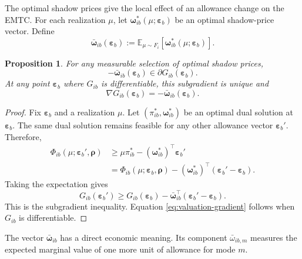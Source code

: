 \documentclass{article}
\newtheorem{proposition}{Proposition}
\begin{document}
The optimal shadow prices give the local effect of an allowance change
on the EMTC. For each realization $\mu$, let
$\bm\omega_{ib}^*(\mu;\bm\varepsilon_b)$ be an optimal shadow-price
vector. Define
\begin{equation}
    \bar{\bm\omega}_{ib}(\bm\varepsilon_b)
    :=
    \mathbb E_{\mu\sim F_i}
    \left[
        \bm\omega_{ib}^*(\mu;\bm\varepsilon_b)
    \right].
    \label{eq:expected-shadow-price}
\end{equation}

\begin{proposition}
For any measurable selection of optimal shadow prices,
\begin{equation}
    -
    \bar{\bm\omega}_{ib}(\bm\varepsilon_b)
    \in
    \partial G_{ib}(\bm\varepsilon_b).
    \label{eq:valuation-subgradient}
\end{equation}
At any point $\bm\varepsilon_b$ where $G_{ib}$ is differentiable, this
subgradient is unique and
\begin{equation}
    \nabla G_{ib}(\bm\varepsilon_b)
    =
    -
    \bar{\bm\omega}_{ib}(\bm\varepsilon_b).
    \label{eq:valuation-gradient}
\end{equation}
\label{prop:expected-shadow-price}
\end{proposition}

\begin{proof}
Fix $\bm\varepsilon_b$ and a realization $\mu$. Let
$(\pi_{ib}^*,\bm\omega_{ib}^*)$ be an optimal dual solution at
$\bm\varepsilon_b$. The same dual solution remains feasible for any
other allowance vector $\bm\varepsilon_b'$. Therefore,
\begin{align}
    \Phi_{ib}(\mu;\bm\varepsilon_b',\bm\rho)
    &\geq
    \mu\pi_{ib}^*
    -
    (\bm\omega_{ib}^*)^{\top}\bm\varepsilon_b'
    \\
    &=
    \Phi_{ib}(\mu;\bm\varepsilon_b,\bm\rho)
    -
    (\bm\omega_{ib}^*)^{\top}
    (\bm\varepsilon_b'-\bm\varepsilon_b).
\end{align}
Taking the expectation gives
\begin{equation}
    G_{ib}(\bm\varepsilon_b')
    \geq
    G_{ib}(\bm\varepsilon_b)
    -
    \bar{\bm\omega}_{ib}^{\top}
    (\bm\varepsilon_b'-\bm\varepsilon_b).
\end{equation}
This is the subgradient inequality. Equation
\eqref{eq:valuation-gradient} follows when $G_{ib}$ is differentiable.
\end{proof}

The vector $\bar{\bm\omega}_{ib}$ has a direct economic meaning. Its
component $\bar\omega_{ib,m}$ measures the expected marginal value of
one more unit of allowance for mode $m$.
\end{document}
